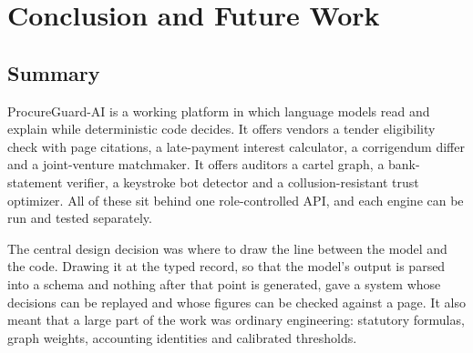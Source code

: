 \chapter{Conclusion and Future Work}
\label{ch:conclusion}

\section{Summary}
ProcureGuard-AI is a working platform in which language models read and explain while deterministic code decides. It offers vendors a tender eligibility check with page citations, a late-payment interest calculator, a corrigendum differ and a joint-venture matchmaker. It offers auditors a cartel graph, a bank-statement verifier, a keystroke bot detector and a collusion-resistant trust optimizer. All of these sit behind one role-controlled API, and each engine can be run and tested separately.

The central design decision was where to draw the line between the model and the code. Drawing it at the typed record, so that the model's output is parsed into a schema and nothing after that point is generated, gave a system whose decisions can be replayed and whose figures can be checked against a page. It also meant that a large part of the work was ordinary engineering: statutory formulas, graph weights, accounting identities and calibrated thresholds.


